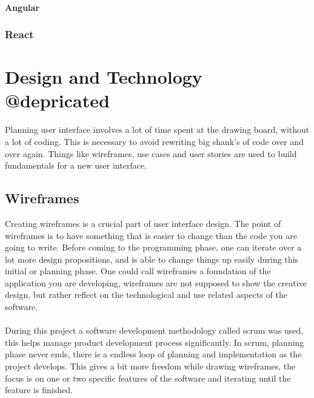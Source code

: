 \subsubsection{Angular}
\subsection{React}

\chapter{Design and Technology @depricated}
Planning user interface involves a lot of time spent at the drawing board, without a lot of coding. This is necessary to avoid rewriting big shank's of code over and over again. Things like wireframes, use cases and user stories are used to build fundamentals for a new user interface.
\section{Wireframes}\label{wireframes}
Creating wireframes is a crucial part of user interface design. The point of wireframes is to have something that is easier to change than the code you are going to write. Before coming to the programming phase, one can iterate over a lot more design propositions, and is able to change things up easily during this initial or planning phase. One could call wireframes a foundation of the application you are developing, wireframes are not supposed to show the creative design, but rather reflect on the technological and use related aspects of the software.\\\\
During this project a software development methodology called scrum was used, this helps manage product development process significantly. In scrum, planning phase never ends, there is a endless loop of planning and implementation as the project develops. This gives a bit more freedom while drawing wireframes, the focus is on one or two specific features of the software and iterating until the feature is finished.\\\\
